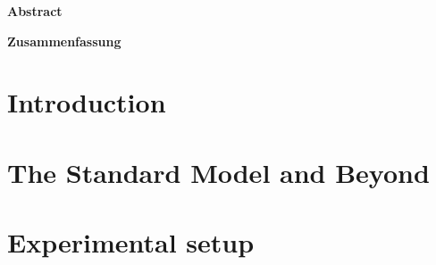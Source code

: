 \documentclass[12pt,USenglish,a4]{book}
\begin{document}
\begin{titlepage}

\end{titlepage}

\newpage\thispagestyle{empty}\mbox{}
\newpage\thispagestyle{empty}\mbox{}

\vspace*{\fill}
\begin{center}
\Large
{\color{MidnightBlue}\textbf{Abstract}}

\end{center}
\vspace*{\fill}


\newpage\thispagestyle{empty}\mbox{}
\newpage\thispagestyle{empty}\mbox{}

\vspace*{\fill}
\begin{center}
\Large
{\color{MidnightBlue}\textbf{Zusammenfassung}}
\end{center}

\vspace*{\fill}

\newpage\thispagestyle{empty}\mbox{}
\setcounter{tocdepth}{2}
\setcounter{page}{0}
\tableofcontents
\setcounter{secnumdepth}{4}
\clearpage

\newpage
{}

\chapter*{Introduction}
\label{ch:Introduction}


\chapter{The Standard Model and Beyond} 
\label{ch:theory}
\vspace*{\fill}\newpage

\vspace*{\fill}\newpage

% 


\chapter{Experimental setup}
\label{ch:CMS}
\vspace*{\fill}\newpage

\end{document}
